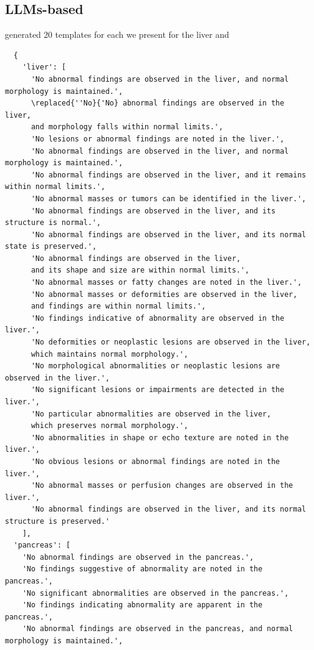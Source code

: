 \documentclass[bioengineering,article,submit,pdftex,moreauthors]{Definitions/mdpi}
\begin{document}
\subsection{LLMs-based}
 generated 20 templates for each  we present   for the liver and 
\begin{verbatim}
  {
    'liver': [
      'No abnormal findings are observed in the liver, and normal morphology is maintained.',
      \replaced{''No}{'No} abnormal findings are observed in the liver, 
      and morphology falls within normal limits.',
      'No lesions or abnormal findings are noted in the liver.',
      'No abnormal findings are observed in the liver, and normal morphology is maintained.',
      'No abnormal findings are observed in the liver, and it remains within normal limits.',
      'No abnormal masses or tumors can be identified in the liver.',
      'No abnormal findings are observed in the liver, and its structure is normal.',
      'No abnormal findings are observed in the liver, and its normal state is preserved.',
      'No abnormal findings are observed in the liver, 
      and its shape and size are within normal limits.',
      'No abnormal masses or fatty changes are noted in the liver.',
      'No abnormal masses or deformities are observed in the liver, 
      and findings are within normal limits.',
      'No findings indicative of abnormality are observed in the liver.',
      'No deformities or neoplastic lesions are observed in the liver, 
      which maintains normal morphology.',
      'No morphological abnormalities or neoplastic lesions are observed in the liver.',
      'No significant lesions or impairments are detected in the liver.',
      'No particular abnormalities are observed in the liver, 
      which preserves normal morphology.',
      'No abnormalities in shape or echo texture are noted in the liver.',
      'No obvious lesions or abnormal findings are noted in the liver.',
      'No abnormal masses or perfusion changes are observed in the liver.',
      'No abnormal findings are observed in the liver, and its normal structure is preserved.'
    ],
  'pancreas': [
    'No abnormal findings are observed in the pancreas.',
    'No findings suggestive of abnormality are noted in the pancreas.',
    'No significant abnormalities are observed in the pancreas.',
    'No findings indicating abnormality are apparent in the pancreas.',
    'No abnormal findings are observed in the pancreas, and normal morphology is maintained.',

\end{verbatim}
\end{document}
